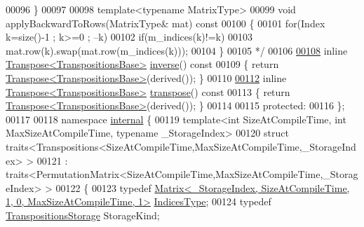 \begin{DoxyCode}
00096 \textcolor{comment}{    \}}
00097 \textcolor{comment}{}
00098 \textcolor{comment}{    template<typename MatrixType>}
00099 \textcolor{comment}{    void applyBackwardToRows(MatrixType& mat) const}
00100 \textcolor{comment}{    \{}
00101 \textcolor{comment}{      for(Index k=size()-1 ; k>=0 ; --k)}
00102 \textcolor{comment}{        if(m\_indices(k)!=k)}
00103 \textcolor{comment}{          mat.row(k).swap(mat.row(m\_indices(k)));}
00104 \textcolor{comment}{    \}}
00105 \textcolor{comment}{    */}
00106 
\hyperlink{class_eigen_1_1_transpositions_base_affcac2f2ebcd5a8bf9067e20d3681d78}{00108}     \textcolor{keyword}{inline} \hyperlink{group___core___module_class_eigen_1_1_transpose}{Transpose<TranspositionsBase>} \hyperlink{class_eigen_1_1_transpositions_base_affcac2f2ebcd5a8bf9067e20d3681d78}{inverse}()\textcolor{keyword}{ const}
00109 \textcolor{keyword}{    }\{ \textcolor{keywordflow}{return} \hyperlink{group___core___module_class_eigen_1_1_transpose}{Transpose<TranspositionsBase>}(derived()); \}
00110 
\hyperlink{class_eigen_1_1_transpositions_base_a2ddede41421797738fc58ee1074efb8f}{00112}     \textcolor{keyword}{inline} \hyperlink{group___core___module_class_eigen_1_1_transpose}{Transpose<TranspositionsBase>} \hyperlink{class_eigen_1_1_transpositions_base_a2ddede41421797738fc58ee1074efb8f}{transpose}()\textcolor{keyword}{ const}
00113 \textcolor{keyword}{    }\{ \textcolor{keywordflow}{return} \hyperlink{group___core___module_class_eigen_1_1_transpose}{Transpose<TranspositionsBase>}(derived()); \}
00114 
00115   \textcolor{keyword}{protected}:
00116 \};
00117 
00118 \textcolor{keyword}{namespace }\hyperlink{namespaceinternal}{internal} \{
00119 \textcolor{keyword}{template}<\textcolor{keywordtype}{int} SizeAtCompileTime, \textcolor{keywordtype}{int} MaxSizeAtCompileTime, \textcolor{keyword}{typename} \_StorageIndex>
00120 \textcolor{keyword}{struct }traits<Transpositions<SizeAtCompileTime,MaxSizeAtCompileTime,\_StorageIndex> >
00121  : traits<PermutationMatrix<SizeAtCompileTime,MaxSizeAtCompileTime,\_StorageIndex> >
00122 \{
00123   \textcolor{keyword}{typedef} 
      \hyperlink{group___core___module_class_eigen_1_1_matrix}{Matrix<\_StorageIndex, SizeAtCompileTime, 1, 0, MaxSizeAtCompileTime, 1>}
       \hyperlink{group___core___module_class_eigen_1_1_matrix}{IndicesType};
00124   \textcolor{keyword}{typedef} \hyperlink{struct_eigen_1_1_transpositions_storage}{TranspositionsStorage} StorageKind;

\end{DoxyCode}
